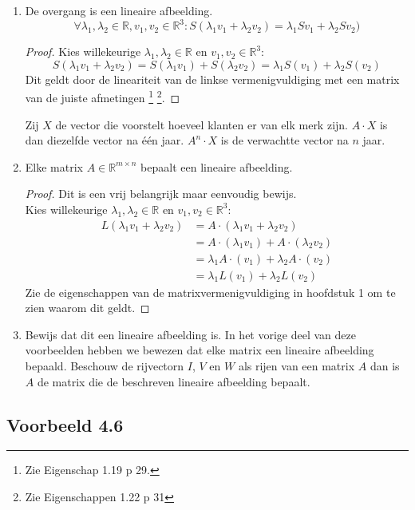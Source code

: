 \documentclass[lineaire_algebra_oplossingen.tex]{subfiles}
\begin{document}
\begin{enumerate}
\item De overgang is een lineaire afbeelding.
\[
\forall \lambda_1, \lambda_2 \in \mathbb{R}, v_1,v_2 \in \mathbb{R}^3: S(\lambda_1v_1+\lambda_2v_2) = \lambda_1 S v_1+\lambda_2Sv_2)
\]
\begin{proof}
Kies willekeurige $\lambda_1, \lambda_2 \in \mathbb{R}$ en $v_1,v_2 \in \mathbb{R}^3$:
\[
S(\lambda_1v_1+\lambda_2v_2)
= S(\lambda_1v_1)+S(\lambda_2v_2)
= \lambda_1 S (v_1)+\lambda_2S(v_2)
\]
Dit geldt door de lineariteit van de linkse vermenigvuldiging met een matrix van de juiste afmetingen \footnote{Zie Eigenschap 1.19 p 29.} \footnote{Zie Eigenschappen 1.22 p 31}.
\end{proof}

Zij $X$ de vector die voorstelt hoeveel klanten er van elk merk zijn.
$A\cdot X$ is dan diezelfde vector na \'e\'en jaar. $A^n\cdot X$ is de verwachtte vector na $n$ jaar.

\item Elke matrix $A \in \mathbb{R}^{m\times n}$ bepaalt een lineaire afbeelding.
\begin{proof}
Dit is een vrij belangrijk maar eenvoudig bewijs.\\
Kies willekeurige $\lambda_1, \lambda_2 \in \mathbb{R}$ en $v_1,v_2 \in \mathbb{R}^3$:
\begin{align*}
L(\lambda_1v_1+\lambda_2v_2)
&= A\cdot(\lambda_1v_1+\lambda_2v_2) \\
&= A\cdot(\lambda_1v_1)+A\cdot(\lambda_2v_2) \\
&= \lambda_1A\cdot(v_1)+\lambda_2A\cdot(v_2) \\
&= \lambda_1 L(v_1)+\lambda_2L(v_2)
\end{align*}
Zie de eigenschappen van de matrixvermenigvuldiging in hoofdstuk 1 om te zien waarom dit geldt.
\end{proof}

\item Bewijs dat dit een lineaire afbeelding is. In het vorige deel van deze voorbeelden hebben we bewezen dat elke matrix een lineaire afbeelding bepaald. Beschouw de rijvectorn $I$, $V$ en $W$ als rijen van een matrix $A$ dan is $A$ de matrix die de beschreven lineaire afbeelding bepaalt.


\end{enumerate}


\subsection{Voorbeeld 4.6}
\label{4.6}
\end{document}
